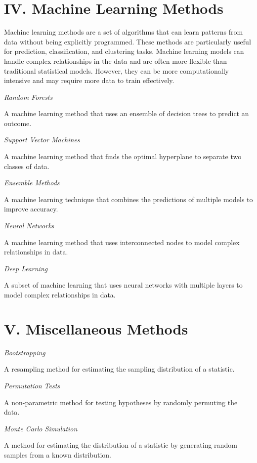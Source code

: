 \documentclass[
  letterpaper,
]{book}
\begin{document}
\section{IV. Machine Learning
Methods}\label{iv.-machine-learning-methods}

Machine learning methods are a set of algorithms that can learn patterns
from data without being explicitly programmed. These methods are
particularly useful for prediction, classification, and clustering
tasks. Machine learning models can handle complex relationships in the
data and are often more flexible than traditional statistical models.
However, they can be more computationally intensive and may require more
data to train effectively.

\emph{Random Forests}

A machine learning method that uses an ensemble of decision trees to
predict an outcome.

\emph{Support Vector Machines}

A machine learning method that finds the optimal hyperplane to separate
two classes of data.

\emph{Ensemble Methods}

A machine learning technique that combines the predictions of multiple
models to improve accuracy.

\emph{Neural Networks}

A machine learning method that uses interconnected nodes to model
complex relationships in data.

\emph{Deep Learning}

A subset of machine learning that uses neural networks with multiple
layers to model complex relationships in data.

\section{V. Miscellaneous Methods}\label{v.-miscellaneous-methods}

\emph{Bootstrapping}

A resampling method for estimating the sampling distribution of a
statistic.

\emph{Permutation Tests}

A non-parametric method for testing hypotheses by randomly permuting the
data.

\emph{Monte Carlo Simulation}

A method for estimating the distribution of a statistic by generating
random samples from a known distribution.
\end{document}
